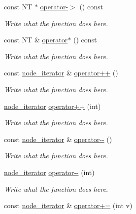 \begin{DoxyCompactItemize}
\item 
const N\+T $\ast$ \hyperlink{classgraph_1_1node__iterator_ad72b585eff3afeefd58d33737a908f84}{operator-\/$>$} () const 
\begin{DoxyCompactList}\small\item\em Write what the function does here. \end{DoxyCompactList}\item 
const N\+T \& \hyperlink{classgraph_1_1node__iterator_a879ba1aaf5dec3da103fdef088f479cd}{operator$\ast$} () const 
\begin{DoxyCompactList}\small\item\em Write what the function does here. \end{DoxyCompactList}\item 
const \hyperlink{classgraph_1_1node__iterator}{node\+\_\+iterator} \& \hyperlink{classgraph_1_1node__iterator_a5384f6440d2b625ec5cfa6f86cd2759b}{operator++} ()
\begin{DoxyCompactList}\small\item\em Write what the function does here. \end{DoxyCompactList}\item 
\hyperlink{classgraph_1_1node__iterator}{node\+\_\+iterator} \hyperlink{classgraph_1_1node__iterator_ade76df2897a43b38180918e1876f36fe}{operator++} (int)
\begin{DoxyCompactList}\small\item\em Write what the function does here. \end{DoxyCompactList}\item 
const \hyperlink{classgraph_1_1node__iterator}{node\+\_\+iterator} \& \hyperlink{classgraph_1_1node__iterator_a27d188431fc8b976d1d4658b02a24726}{operator-\/-\/} ()
\begin{DoxyCompactList}\small\item\em Write what the function does here. \end{DoxyCompactList}\item 
\hyperlink{classgraph_1_1node__iterator}{node\+\_\+iterator} \hyperlink{classgraph_1_1node__iterator_ad227228af099908edea6f38e02c72303}{operator-\/-\/} (int)
\begin{DoxyCompactList}\small\item\em Write what the function does here. \end{DoxyCompactList}\item 
const \hyperlink{classgraph_1_1node__iterator}{node\+\_\+iterator} \& \hyperlink{classgraph_1_1node__iterator_af2701cb2f00044bd1e2c850d65d32f5e}{operator+=} (int v)

\end{DoxyCompactItemize}
